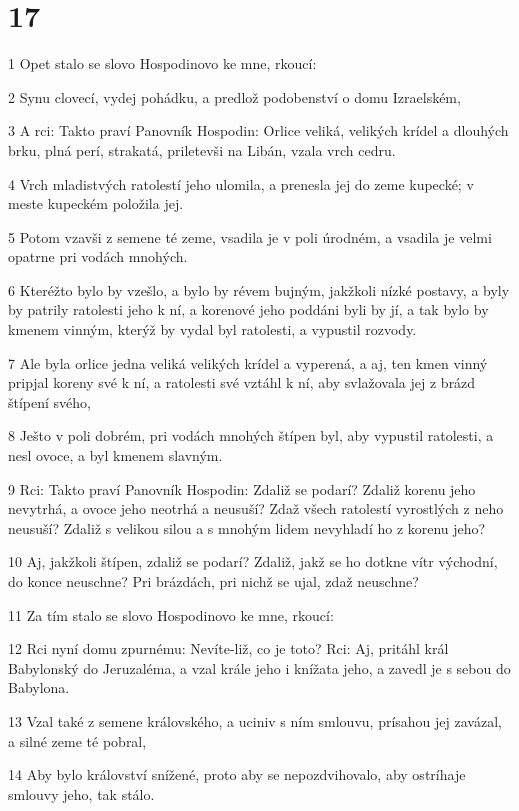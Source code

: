 \chapter{17}

\par 1 Opet stalo se slovo Hospodinovo ke mne, rkoucí:
\par 2 Synu clovecí, vydej pohádku, a predlož podobenství o domu Izraelském,
\par 3 A rci: Takto praví Panovník Hospodin: Orlice veliká, velikých krídel a dlouhých brku, plná perí, strakatá, priletevši na Libán, vzala vrch cedru.
\par 4 Vrch mladistvých ratolestí jeho ulomila, a prenesla jej do zeme kupecké; v meste kupeckém položila jej.
\par 5 Potom vzavši z semene té zeme, vsadila je v poli úrodném, a vsadila je velmi opatrne pri vodách mnohých.
\par 6 Kteréžto bylo by vzešlo, a bylo by révem bujným, jakžkoli nízké postavy, a byly by patrily ratolesti jeho k ní, a korenové jeho poddáni byli by jí, a tak bylo by kmenem vinným, kterýž by vydal byl ratolesti, a vypustil rozvody.
\par 7 Ale byla orlice jedna veliká velikých krídel a vyperená, a aj, ten kmen vinný pripjal koreny své k ní, a ratolesti své vztáhl k ní, aby svlažovala jej z brázd štípení svého,
\par 8 Ješto v poli dobrém, pri vodách mnohých štípen byl, aby vypustil ratolesti, a nesl ovoce, a byl kmenem slavným.
\par 9 Rci: Takto praví Panovník Hospodin: Zdaliž se podarí? Zdaliž korenu jeho nevytrhá, a ovoce jeho neotrhá a neusuší? Zdaž všech ratolestí vyrostlých z neho neusuší? Zdaliž s velikou silou a s mnohým lidem nevyhladí ho z korenu jeho?
\par 10 Aj, jakžkoli štípen, zdaliž se podarí? Zdaliž, jakž se ho dotkne vítr východní, do konce neuschne? Pri brázdách, pri nichž se ujal, zdaž neuschne?
\par 11 Za tím stalo se slovo Hospodinovo ke mne, rkoucí:
\par 12 Rci nyní domu zpurnému: Nevíte-liž, co je toto? Rci: Aj, pritáhl král Babylonský do Jeruzaléma, a vzal krále jeho i knížata jeho, a zavedl je s sebou do Babylona.
\par 13 Vzal také z semene královského, a uciniv s ním smlouvu, prísahou jej zavázal, a silné zeme té pobral,
\par 14 Aby bylo království snížené, proto aby se nepozdvihovalo, aby ostríhaje smlouvy jeho, tak stálo.
